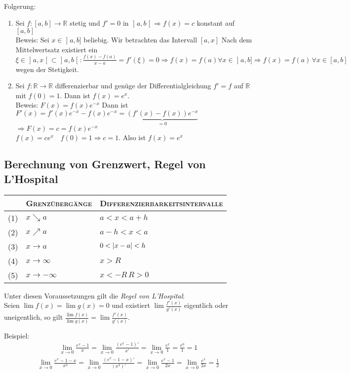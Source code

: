 \documentclass[ngerman,titlepage,twoside, parskip=half*]{scrreprt}
\newcommand*{\R}{\mathbb{R}}
\theoremstyle{break}
\theoremstyle{nonumberbreak}
\DeclarePairedDelimiter{\abs}{\lvert}{\rvert}
\newcommand*{\lsofint}[1]{\mathopen{]}#1]}   %
\newcommand*{\bsofint}[1]{\mathopen{]}#1\mathclose{[}} %
\begin{document}
Folgerung:
\begin{enumerate}[(1)]
  \item Sei $f\colon[a,b]\rightarrow\R$ stetig und $f'=0$ in $\bsofint{a,b}
    \Rightarrow f(x)=c$ konstant auf $[a,b]$\\
    Beweis: Sei $x\in\lsofint{a,b}$ beliebig. Wir betrachten das Intervall $[a,x]$
    Nach dem Mittelwertsatz existiert ein $\xi\in\bsofint{a,x}\subset\bsofint{a,b}\colon
    \frac{f(x)-f(a)}{x-a}=f'(\xi)=0\Rightarrow f(x)=f(a) \forall x\in
    \lsofint{a,b}\Rightarrow f(x)=f(a)\,\forall x\in[a,b]$ wegen der Stetigkeit.
  \item Sei $f\colon\R\rightarrow\R$ differenzierbar und genüge der
    Differentialgleichung $f'=f$ auf $\R$ mit $f(0)=1$. Dann ist
    $f(x)=e^x$.\\
    Beweis: $F(x)=f(x)e^{-x}$ Dann ist $F'(x)=f'(x)e^{-x}-f(x)e^{-x}=
    \underbrace{(f'(x)-f(x))e^{-x}}_{=0}$\\
    $\Rightarrow F(x)=c=f(x)e^{-x}$\\
    $f(x)=ce^x\quad f(0)=1\Rightarrow c=1$. Also ist $f(x)=e^x$
\end{enumerate}

\subsection{Berechnung von Grenzwert, Regel von L'Hospital}
\begin{tabular}{c|l|l}
  & \textsc{Grenzübergänge} & \textsc{Differenzierbarkeitsintervalle}\\
  \hline
  (1) & $x\searrow a$ & $a<x<a+h$\\
  (2) & $x\nearrow a$ & $a-h<x<a$\\
  (3) & $x\rightarrow a$ & $0<\abs{x-a}<h$\\
  (4) & $x\rightarrow\infty$ & $ x>R$\\
  (5) & $x\rightarrow -\infty$ & $x<-R\,R>0$
\end{tabular}

Unter diesen Voraussetzungen gilt die \emph{Regel von L'Hospital}:\\
Seien $\lim f(x)=\lim g(x)=0$ und existiert $\lim \frac{f'(x)}{g'(x)}$
eigentlich oder uneigentlich, so gilt $\frac{\lim f(x)}{\lim g(x)}=\lim
\frac{f'(x)}{g'(x)}$.

Beispiel: \begin{gather*}\lim_{x\rightarrow 0} \frac{e^x-1}{x}=\lim_{x\rightarrow 0}
\frac{(e^x-1)'}{x'}
=\lim_{x\rightarrow 0} \frac{e^x}{1}=\frac{e^0}{1}=1\end{gather*}
\begin{gather*}\lim_{x\rightarrow 0} \frac{e^x-1-x}{x^2}=\lim_{x\rightarrow 0}
\frac{(e^x-1-x)'}{(x^2)'}=\lim_{x\rightarrow 0}\frac{e^x-1}{2x}=
\lim_{x\rightarrow 0}\frac{e^x}{2x}=\frac{1}{2}\end{gather*}
\end{document}
